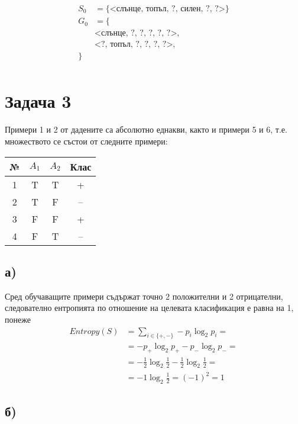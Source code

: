 \documentclass{article}
\begin{document}
\begin{align*}
    S_0 &= \{ \textrm{<слънце, топъл, ?, силен, ?, ?>} \} \\
    G_0 &= \{ \\
        &\textrm{<слънце, ?, ?, ?, ?, ?>}, \\
        &\textrm{<?, топъл, ?, ?, ?, ?>}, \\
    \} \\
\end{align*}

\pagebreak

\section*{Задача 3}

Примери 1 и 2  от дадените са абсолютно еднакви, както и примери 5 и 6, т.е. множеството се състои от следните примери:

\begin{center}
\begin{tabular}{ |c|c|c|c| }
    \hline
    № & \(A_1\) & \(A_2\) & Клас \\
    \hline
    1 & T & T & + \\
    2 & T & F & -- \\
    3 & F & F & + \\
    4 & F & T & -- \\
    \hline
\end{tabular}
\end{center}

\subsection*{а)}

Сред обучаващите примери съдържат точно 2 положителни и 2 отрицателни,
следователно ентропията по отношение на целевата класификация е равна на 1, понеже
\begin{align*}
    Entropy(S) &= \sum_{i \in \{+, -\}} -p_i \log_2 p_i = \\
      &= -p_+ \log_2 p_+ - p_- \log_2 p_- = \\
      &= -\frac{1}{2} \log_2 \frac{1}{2} - \frac{1}{2} \log_2 \frac{1}{2} = \\
      &= -1 \log_2 \frac{1}{2} = (-1)^2 = 1
\end{align*}

\subsection*{б)}
\end{document}
